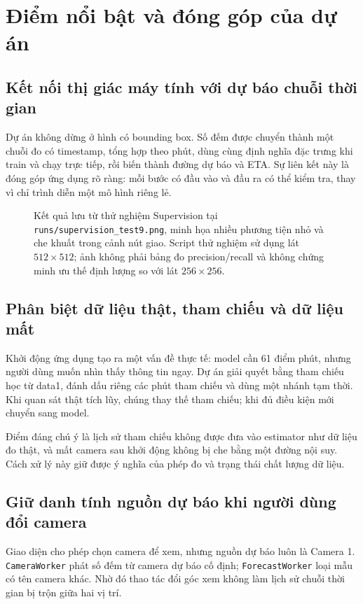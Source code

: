 \section{Điểm nổi bật và đóng góp của dự án}

    \subsection{Kết nối thị giác máy tính với dự báo chuỗi thời gian}
    Dự án không dừng ở hình có bounding box. Số đếm được chuyển thành một chuỗi đo có timestamp, tổng hợp theo phút, dùng cùng định nghĩa đặc trưng khi train và chạy trực tiếp, rồi biến thành đường dự báo và ETA. Sự liên kết này là đóng góp ứng dụng rõ ràng: mỗi bước có đầu vào và đầu ra có thể kiểm tra, thay vì chỉ trình diễn một mô hình riêng lẻ.

    \begin{figure}[htbp]
        \centering
        \caption{Kết quả lưu từ thử nghiệm Supervision tại \texttt{runs/supervision\_test9.png}, minh họa nhiều phương tiện nhỏ và che khuất trong cảnh nút giao. Script thử nghiệm sử dụng lát $512 \times 512$; ảnh không phải bảng đo precision/recall và không chứng minh ưu thế định lượng so với lát $256 \times 256$.}
        \label{fig:supervision_test}
    \end{figure}

    \subsection{Phân biệt dữ liệu thật, tham chiếu và dữ liệu mất}
    Khởi động ứng dụng tạo ra một vấn đề thực tế: model cần 61 điểm phút, nhưng người dùng muốn nhìn thấy thông tin ngay. Dự án giải quyết bằng tham chiếu học từ data1, đánh dấu riêng các phút tham chiếu và dùng một nhánh tạm thời. Khi quan sát thật tích lũy, chúng thay thế tham chiếu; khi đủ điều kiện mới chuyển sang model.

    Điểm đáng chú ý là lịch sử tham chiếu không được đưa vào estimator như dữ liệu đo thật, và mất camera sau khởi động không bị che bằng một đường nội suy. Cách xử lý này giữ được ý nghĩa của phép đo và trạng thái chất lượng dữ liệu.

    \subsection{Giữ danh tính nguồn dự báo khi người dùng đổi camera}
    Giao diện cho phép chọn camera để xem, nhưng nguồn dự báo luôn là Camera 1. \texttt{CameraWorker} phát số đếm từ camera dự báo cố định; \texttt{ForecastWorker} loại mẫu có tên camera khác. Nhờ đó thao tác đổi góc xem không làm lịch sử chuỗi thời gian bị trộn giữa hai vị trí.

